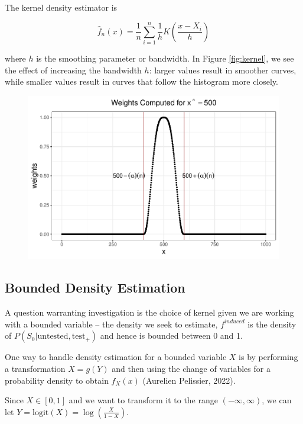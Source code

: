 \documentclass[12pt,twoside]{smiththesis}
\begin{document}
The kernel density estimator is

\[\hat f_n(x) = \frac 1n \sum_{i=1}^n \frac 1h K\left(\dfrac{x-X_i}{h} \right)\]

where \(h\) is the smoothing parameter or bandwidth. In Figure \ref{fig:kernel}, we see the effect of increasing the bandwidth \(h\): larger values result in smoother curves, while smaller values result in curves that follow the histogram more closely.
\begin{figure}

{\centering \includegraphics[width=1\linewidth]{thesis_files/figure-latex/unnamed-chunk-31-1} 

}

\caption{\label{fig:kernel}}\label{fig:unnamed-chunk-31}
\end{figure}
\hypertarget{bounded-density-estimation}{%
\subsection{Bounded Density Estimation}\label{bounded-density-estimation}}

A question warranting investigation is the choice of kernel given we are working with a bounded variable -- the density we seek to estimate, \(f^{induced}\) is the density of \(P(S_0|\text{untested}, \text{test}_+)\) and hence is bounded between 0 and 1.

One way to handle density estimation for a bounded variable \(X\) is by performing a transformation
\(X=g(Y)\) and then using the change of variables for a probability density to obtain \(f_X(x)\) (Aurelien Pelissier, 2022).

Since \(X \in [0,1]\) and we want to transform it to the range \((-\infty,\infty)\), we can let \(Y = \text{logit}(X) = \log \left( \frac{X}{1-X} \right)\).
\end{document}
